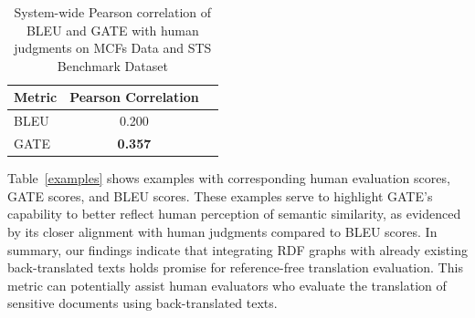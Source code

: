 \documentclass[runningheads]{llncs}
\begin{document}
\begin{table}[h]
  \centering
  \caption{System-wide Pearson correlation of BLEU and GATE with human judgments on MCFs Data and STS Benchmark Dataset}
  \begin{tabular}{|l|c|c}
    \hline 
  Metric & Pearson Correlation \\
  \hline
  
  BLEU   & 0.200                            \\
  \hline 
  GATE   & \textbf{0.357}    \\
  \hline                        
  \end{tabular}
  \label{score}
\end{table}


Table~\ref{examples} shows examples with corresponding human evaluation scores, GATE scores, and BLEU scores. These examples serve to highlight GATE's capability to better reflect human perception of semantic similarity, as evidenced by its closer alignment with human judgments compared to BLEU scores. In summary, our findings indicate that integrating RDF graphs with already existing back-translated texts holds promise for reference-free translation evaluation. This metric can potentially assist human evaluators who evaluate the translation of sensitive documents using back-translated texts.
\end{document}

